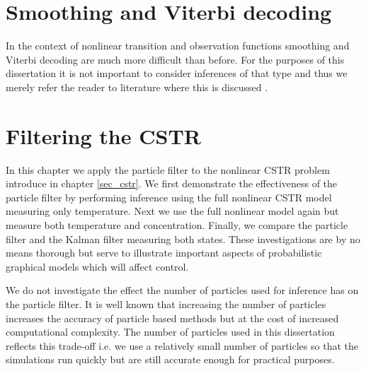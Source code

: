 \section{Smoothing and Viterbi decoding}
In the context of nonlinear transition and observation functions smoothing and Viterbi decoding are much more difficult than before. For the purposes of this dissertation it is not important to consider inferences of that type and thus we merely refer the reader to literature where this is discussed \cite{barber}\cite{pftut}\cite{gsf1}\cite{murphy1}\cite{murphy2}.

\section{Filtering the CSTR}
\label{sec_nonlinmods_filtering}
In this chapter we apply the particle filter to the nonlinear CSTR problem introduce in chapter \ref{sec_cstr}. We first demonstrate the effectiveness of the particle filter by performing inference using the full nonlinear CSTR model measuring only temperature. Next we use the full nonlinear model again but measure both temperature and concentration. Finally, we compare the particle filter and the Kalman filter measuring both states. These investigations are by no means thorough but serve to illustrate important aspects of probabilistic graphical models which will affect control.

We do not investigate the effect the number of particles used for inference has on the particle filter. It is well known that increasing the number of particles increases the accuracy of particle based methods \cite{murphy1} but at the cost of increased computational complexity. The number of particles used in this dissertation reflects this trade-off i.e. we use a relatively small number of particles so that the simulations run quickly but are still accurate enough for practical purposes. 

